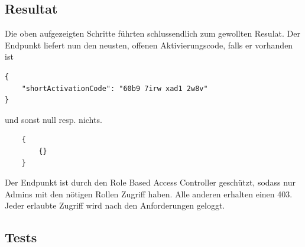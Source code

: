 \subsection{Resultat}
Die oben aufgezeigten Schritte führten schlussendlich zum gewollten Resulat. Der Endpunkt liefert nun den neusten, offenen Aktivierungscode, falls er vorhanden ist
\begin{verbatim}
{
	"shortActivationCode": "60b9 7irw xad1 2w8v"
}
\end{verbatim}
und sonst null resp. nichts.
\begin{verbatim}
	{
		{}
	}
\end{verbatim}
Der Endpunkt ist durch den Role Based Access Controller geschützt, sodass nur Admins mit den nötigen Rollen Zugriff haben. Alle anderen erhalten einen 403. Jeder erlaubte Zugriff wird nach den Anforderungen geloggt.
\subsection{Tests}
















